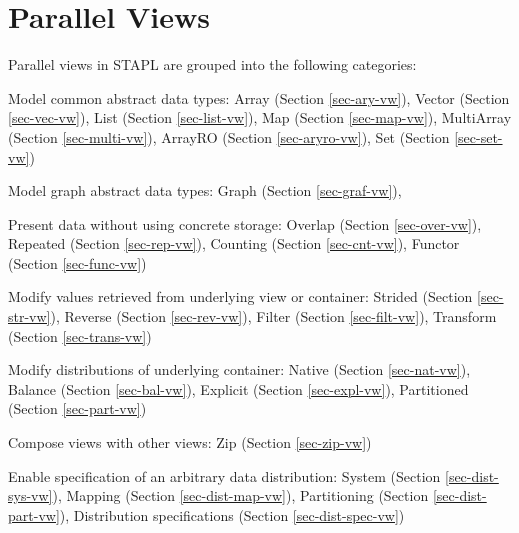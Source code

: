 \chapter{Parallel Views}

Parallel views in STAPL are grouped into the following categories:
\vspace{0.4cm}

Model common abstract data types:
\newline
Array (Section \ref{sec-ary-vw}),
Vector (Section \ref{sec-vec-vw}),
List (Section \ref{sec-list-vw}),
Map (Section \ref{sec-map-vw}),
MultiArray (Section \ref{sec-multi-vw}),
ArrayRO (Section \ref{sec-aryro-vw}),
Set (Section \ref{sec-set-vw})
\vspace{0.4cm}

Model graph abstract data types:
\newline
Graph (Section \ref{sec-graf-vw}),
\vspace{0.4cm}

Present data without using concrete storage:
\newline
Overlap (Section \ref{sec-over-vw}),
Repeated (Section \ref{sec-rep-vw}),
Counting (Section \ref{sec-cnt-vw}),
Functor (Section \ref{sec-func-vw})
\vspace{0.4cm}

Modify values retrieved from underlying view or container:
\newline
Strided (Section \ref{sec-str-vw}),
Reverse (Section \ref{sec-rev-vw}),
Filter (Section \ref{sec-filt-vw}),
Transform (Section \ref{sec-trans-vw})
\vspace{0.4cm}

Modify distributions of underlying container:
\newline
Native (Section \ref{sec-nat-vw}),
Balance (Section \ref{sec-bal-vw}),
Explicit (Section \ref{sec-expl-vw}),
Partitioned (Section \ref{sec-part-vw})
\vspace{0.4cm}

Compose views with other views:
\newline
Zip (Section \ref{sec-zip-vw})
\vspace{0.4cm}

Enable specification of an arbitrary data distribution:
\newline
System (Section \ref{sec-dist-sys-vw}),
Mapping (Section \ref{sec-dist-map-vw}),
Partitioning (Section \ref{sec-dist-part-vw}),
Distribution specifications (Section \ref{sec-dist-spec-vw})

\pagebreak

